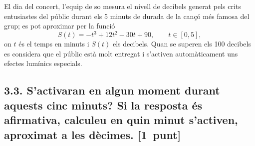 \documentclass[11pt,a4paper]{article}
\begin{document}
\vspace{0.6em}
\noindent El dia del concert, l'equip de so mesura el nivell de decibels generat pels crits entusiastes del públic durant els 5 minuts de durada de la cançó més famosa del grup; es pot aproximar per la funció
\[
S(t) = -t^{3} + 12t^{2} - 30t + 90, \qquad t \in [0, 5],
\]
on $t$ és el temps en minuts i $S(t)$ els decibels. Quan se superen els 100 decibels es considera que el públic està molt entregat i s'activen automàticament uns efectes lumínics especials.

\subsection*{3.3. \normalfont S'activaran en algun moment durant aquests cinc minuts? Si la resposta és afirmativa, calculeu en quin minut s'activen, aproximat a les dècimes. \hfill\textnormal{[1~punt]}}

\end{document}
